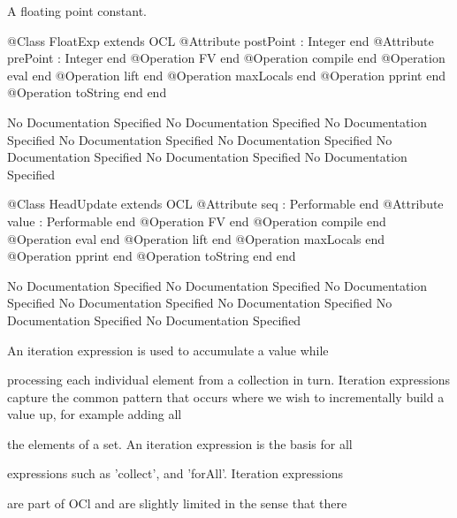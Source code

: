        A floating point constant.
\begin{Interface}
@Class FloatExp extends OCL
  @Attribute postPoint : Integer end
  @Attribute prePoint : Integer end
  @Operation FV end
  @Operation compile end
  @Operation eval end
  @Operation lift end
  @Operation maxLocals end
  @Operation pprint end
  @Operation toString end
end
\end{Interface}
No Documentation Specified
No Documentation Specified
No Documentation Specified
No Documentation Specified
No Documentation Specified
No Documentation Specified
No Documentation Specified
No Documentation Specified
\begin{Interface}
@Class HeadUpdate extends OCL
  @Attribute seq : Performable end
  @Attribute value : Performable end
  @Operation FV end
  @Operation compile end
  @Operation eval end
  @Operation lift end
  @Operation maxLocals end
  @Operation pprint end
  @Operation toString end
end
\end{Interface}
No Documentation Specified
No Documentation Specified
No Documentation Specified
No Documentation Specified
No Documentation Specified
No Documentation Specified
No Documentation Specified

       An iteration expression is used to accumulate a value while

       processing each individual element from a collection in turn.
       Iteration expressions capture the common pattern that occurs where 
       we wish to incrementally build a value up, for example adding all

       the elements of a set. An iteration expression is the basis for all

       expressions such as 'collect', and 'forAll'. Iteration expressions

       are part of OCl and are slightly limited in the sense that there

